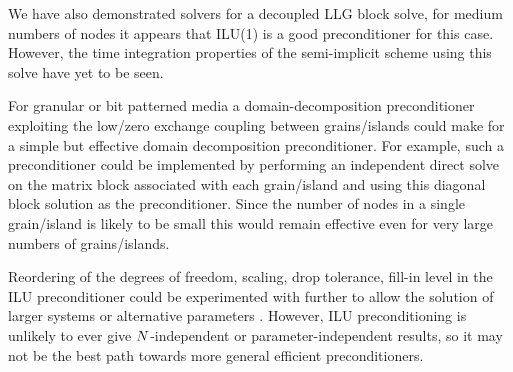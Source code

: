 We have also demonstrated solvers for a decoupled LLG block solve, for medium numbers of nodes it appears that ILU(1) is a good preconditioner for this case.
However, the time integration properties of the semi-implicit scheme using this solve have yet to be seen.


For granular or bit patterned media a domain-decomposition preconditioner exploiting the low/zero exchange coupling between grains/islands could make for a simple but effective domain decomposition preconditioner.
For example, such a preconditioner could be implemented by performing an independent direct solve on the matrix block associated with each grain/island and using this diagonal block solution as the preconditioner.
Since the number of nodes in a single grain/island is likely to be small this would remain effective even for very large numbers of grains/islands.

Reordering of the degrees of freedom, scaling, drop tolerance, fill-in level in the ILU preconditioner could be experimented with further to allow the solution of larger systems or alternative parameters \cite[287]{Saad2000}.
However, ILU preconditioning is unlikely to ever give $N$-independent or parameter-independent results, so it may not be the best path towards more general efficient preconditioners.





